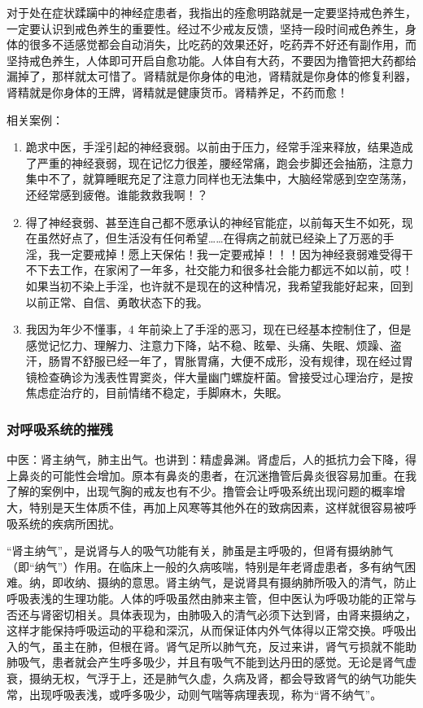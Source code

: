 \documentclass{ctexart}
\begin{document}
对于处在症状蹂躏中的神经症患者，我指出的痊愈明路就是一定要坚持戒色养生，一定要认识到戒色养生的重要性。经过不少戒友反馈，坚持一段时间戒色养生，身体的很多不适感觉都会自动消失，比吃药的效果还好，吃药弄不好还有副作用，而坚持戒色养生，人体即可开启自愈功能。人体自有大药，不要因为撸管把大药都给漏掉了，那样就太可惜了。肾精就是你身体的电池，肾精就是你身体的修复利器，肾精就是你身体的王牌，肾精就是健康货币。肾精养足，不药而愈！

相关案例：

\begin{enumerate}
    \item 跪求中医，手淫引起的神经衰弱。以前由于压力，经常手淫来释放，结果造成了严重的神经衰弱，现在记忆力很差，腰经常痛，跑会步脚还会抽筋，注意力集中不了，就算睡眠充足了注意力同样也无法集中，大脑经常感到空空荡荡，还经常感到疲倦。谁能救救我啊！？
    \item 得了神经衰弱、甚至连自己都不愿承认的神经官能症，以前每天生不如死，现在虽然好点了，但生活没有任何希望……在得病之前就已经染上了万恶的手淫，我一定要戒掉！愿上天保佑！我一定要戒掉！！！因为神经衰弱难受得干不下去工作，在家闲了一年多，社交能力和很多社会能力都远不如以前，哎！如果当初不染上手淫，也许就不是现在的这种情况，我希望我能好起来，回到以前正常、自信、勇敢状态下的我。
    \item 我因为年少不懂事，4 年前染上了手淫的恶习，现在已经基本控制住了，但是感觉记忆力、理解力、注意力下降，站不稳、眩晕、头痛、失眠、烦躁、盗汗，肠胃不舒服已经一年了，胃胀胃痛，大便不成形，没有规律，现在经过胃镜检查确诊为浅表性胃窦炎，伴大量幽门螺旋杆菌。曾接受过心理治疗，是按焦虑症治疗的，目前情绪不稳定，手脚麻木，失眠。
\end{enumerate}

\subsubsection{对呼吸系统的摧残}

中医：肾主纳气，肺主出气。也讲到：精虚鼻渊。肾虚后，人的抵抗力会下降，得上鼻炎的可能性会增加。原本有鼻炎的患者，在沉迷撸管后鼻炎很容易加重。在我了解的案例中，出现气胸的戒友也有不少。撸管会让呼吸系统出现问题的概率增大，特别是天生体质不佳，再加上风寒等其他外在的致病因素，这样就很容易被呼吸系统的疾病所困扰。

“肾主纳气”，是说肾与人的吸气功能有关，肺虽是主呼吸的，但肾有摄纳肺气（即“纳气”）作用。在临床上一般的久病咳喘，特别是年老肾虚患者，多有纳气困难。纳，即收纳、摄纳的意思。肾主纳气，是说肾具有摄纳肺所吸入的清气，防止呼吸表浅的生理功能。人体的呼吸虽然由肺来主管，但中医认为呼吸功能的正常与否还与肾密切相关。具体表现为，由肺吸入的清气必须下达到肾，由肾来摄纳之，这样才能保持呼吸运动的平稳和深沉，从而保证体内外气体得以正常交换。呼吸出入的气，虽主在肺，但根在肾。肾气足所以肺气充，反过来讲，肾气亏损就不能助肺吸气，患者就会产生呼多吸少，并且有吸气不能到达丹田的感觉。无论是肾气虚衰，摄纳无权，气浮于上，还是肺气久虚，久病及肾，都会导致肾气的纳气功能失常，出现呼吸表浅，或呼多吸少，动则气喘等病理表现，称为“肾不纳气”。
\end{document}
